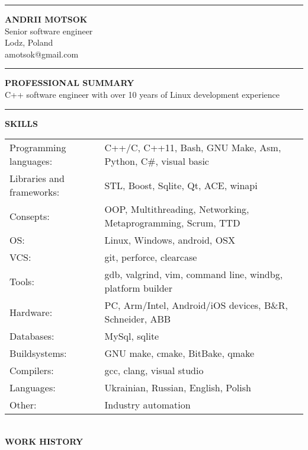 \documentclass{article}
\begin{document}
\noindent\hrule height 5pt \vspace{4mm} \noindent
{\selectfont\huge{\textbf{ANDRII MOTSOK}}} \\
{\color{lightgray}Senior software engineer\\Lodz, Poland}\\
{\color{cyan}amotsok@gmail.com}\\
{\color{lightgray}\hrule height 0.2mm}
\vspace{2mm}
\noindent
\textbf{PROFESSIONAL SUMMARY}\\
C++ software engineer with over 10 years of Linux development experience\\
{\color{lightgray}\hrule height 0.2mm} \vspace{2mm}
\noindent
\textbf{SKILLS}\\
\noindent\begin{tabular}{@{}ll}
  Programming languages: & C++/C, C++11, Bash, GNU Make, Asm, Python, C\#, visual basic\\
  Libraries and frameworks: & STL, Boost, Sqlite, Qt, ACE, winapi\\
  Consepts: & OOP, Multithreading, Networking, Metaprogramming, Scrum, TTD\\
  OS: & Linux, Windows, android, OSX\\
  VCS: & git, perforce, clearcase\\
  Tools: & gdb, valgrind, vim, command line, windbg, platform builder\\
  Hardware: & PC, Arm/Intel, Android/iOS devices, B\&R, Schneider, ABB\\
  Databases: &MySql, sqlite\\
  Buildsystems: &GNU make, cmake, BitBake, qmake\\
  Compilers: &gcc, clang, visual studio\\
  Languages: &Ukrainian, Russian, English, Polish\\
  Other: &  Industry automation\\
\end{tabular}\\
\vspace{2mm}
\noindent \textbf{WORK HISTORY}\\[2mm]
\end{document}
